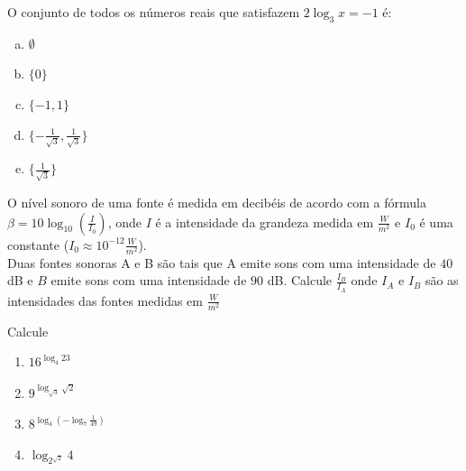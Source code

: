 \begin{exer}[UFMG] O conjunto de todos os números reais que satisfazem $2\log_3{x}=-1$ é: 
\begin{enumerate}[a)]
\item $\emptyset$
\item $\{0\}$
\item $\{-1,1\}$
\item $\{-\frac{1}{\sqrt{3}},\frac{1}{\sqrt{3}}\}$
\item $\{\frac{1}{\sqrt{3}}\}$
\end{enumerate}
\end{exer}

\begin{exer} O nível sonoro de uma fonte é medida em decibéis de acordo com a fórmula $\beta = 10 \log_{10} \left(\frac{I}{I_0} \right)$, onde $I$ é a intensidade da grandeza medida em $\frac{W}{m^2}$ e $I_0$ é uma constante ($I_0 \approx 10^{-12} \frac{W}{m^2}$).\\ Duas fontes sonoras A e B são tais que A emite sons com uma intensidade de $40$ dB e $B$ emite sons com uma intensidade de $90$ dB. Calcule $\frac{I_B}{I_A}$ onde $I_A$ e $I_B$ são as intensidades das fontes medidas em $\frac{W}{m^2}$
\end{exer}

\begin{exer} Calcule
\begin{enumerate}
\item $16^{\log_4{23}}$
\item $9^{\log_{\sqrt{3}}{\sqrt{2}}}$
\item $8^{\log_{4}{(-\log_7{\frac{1}{49}})}}$
\item $\log_{2^{\sqrt{2}}}{4}$
\end{enumerate}
\end{exer}


